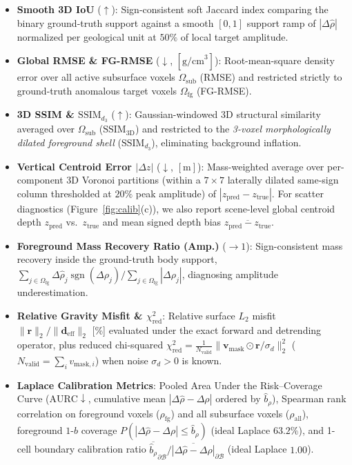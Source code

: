 \documentclass[11pt,a4paper]{article}
\begin{document}
\begin{itemize}[leftmargin=1.4em,itemsep=0.25em]
  \item \textbf{Smooth 3D IoU} ($\uparrow$): Sign-consistent soft Jaccard index comparing the binary ground-truth support against a smooth $[0,1]$ support ramp of $|\Delta\hat{\rho}|$ normalized per geological unit at $50\%$ of local target amplitude.
  \item \textbf{Global RMSE \& FG-RMSE} ($\downarrow$, $[\text{g/cm}^3]$): Root-mean-square density error over all active subsurface voxels $\Omega_{\mathrm{sub}}$ (RMSE) and restricted strictly to ground-truth anomalous target voxels $\Omega_{\mathrm{fg}}$ (FG-RMSE).
  \item \textbf{3D SSIM \& $\text{SSIM}_{d_3}$} ($\uparrow$): Gaussian-windowed 3D structural similarity \citep{wang2004ssim} averaged over $\Omega_{\mathrm{sub}}$ ($\text{SSIM}_{\mathrm{3D}}$) and restricted to the \emph{3-voxel morphologically dilated foreground shell} ($\text{SSIM}_{d_3}$), eliminating background inflation.
  \item \textbf{Vertical Centroid Error $|\Delta z|$} ($\downarrow$, $[\text{m}]$): Mass-weighted average over per-component 3D Voronoi partitions (within a $7\times 7$ laterally dilated same-sign column thresholded at $20\%$ peak amplitude) of $|z_{\mathrm{pred}} - z_{\mathrm{true}}|$. For scatter diagnostics (Figure~\ref{fig:calib}(c)), we also report scene-level global centroid depth $z_{\mathrm{pred}}$ vs.\ $z_{\mathrm{true}}$ and mean signed depth bias $\overline{z_{\mathrm{pred}} - z_{\mathrm{true}}}$.
  \item \textbf{Foreground Mass Recovery Ratio (Amp.)} ($\to 1$): Sign-consistent mass recovery inside the ground-truth body support, $\sum_{j \in \Omega_{\mathrm{fg}}} \Delta\hat{\rho}_j \operatorname{sgn}(\Delta\rho_j) / \sum_{j \in \Omega_{\mathrm{fg}}} |\Delta\rho_j|$, diagnosing amplitude underestimation.
  \item \textbf{Relative Gravity Misfit \& $\chi^2_{\mathrm{red}}$}: Relative surface $L_2$ misfit $\|\mathbf{r}\|_2 / \|\mathbf{d}_{\mathrm{eff}}\|_2$ [\%] evaluated under the exact forward and detrending operator, plus reduced chi-squared $\chi^2_{\mathrm{red}} = \frac{1}{N_{\mathrm{valid}}}\|\mathbf{v}_{\mathrm{mask}}\odot\mathbf{r}/\sigma_d\|_2^2$ ($N_{\mathrm{valid}}=\sum_i v_{\mathrm{mask},i}$) when noise $\sigma_d > 0$ is known.
  \item \textbf{Laplace Calibration Metrics}: Pooled Area Under the Risk--Coverage Curve ($\mathrm{AURC}\downarrow$, cumulative mean $|\Delta\hat{\rho}-\Delta\rho|$ ordered by $\hat{b}_\rho$), Spearman rank correlation on foreground voxels ($\rho_{\mathrm{fg}}$) and all subsurface voxels ($\rho_{\mathrm{all}}$), foreground $1$-$b$ coverage $P(|\Delta\hat{\rho}-\Delta\rho| \le \hat{b}_\rho)$ (ideal Laplace $63.2\%$), and 1-cell boundary calibration ratio $\overline{\hat{b}_\rho}_{\partial\mathcal{B}} / \overline{|\Delta\hat{\rho}-\Delta\rho|}_{\partial\mathcal{B}}$ (ideal Laplace $1.00$).
\end{itemize}
\end{document}
